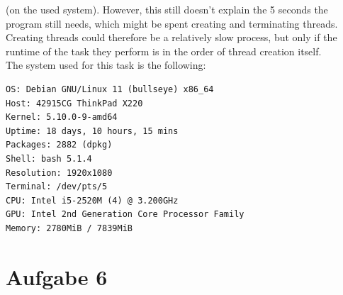 \documentclass{article}
\begin{document}
(on the used system). However, this still doesn't explain the 5 seconds
the program still needs, which might be spent creating and terminating threads.
Creating threads could therefore be a relatively slow process, but only if
the runtime of the task they perform is in the order of thread creation itself.\\
The system used for this task is the following:
\begin{lstlisting}
OS: Debian GNU/Linux 11 (bullseye) x86_64 
Host: 42915CG ThinkPad X220 
Kernel: 5.10.0-9-amd64 
Uptime: 18 days, 10 hours, 15 mins 
Packages: 2882 (dpkg) 
Shell: bash 5.1.4 
Resolution: 1920x1080 
Terminal: /dev/pts/5 
CPU: Intel i5-2520M (4) @ 3.200GHz 
GPU: Intel 2nd Generation Core Processor Family 
Memory: 2780MiB / 7839MiB
\end{lstlisting}
\section*{Aufgabe 6}
\end{document}
